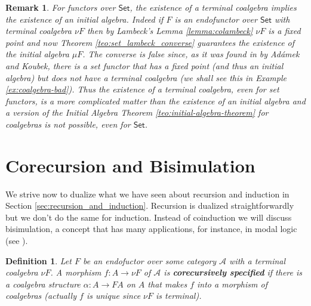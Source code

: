 \documentclass[letterpaper, 11pt, oneside]{memoir}
\theoremstyle{myteo}
\newtheorem{definition}[theorem]{Definition}
\newtheorem{remark}[theorem]{Remark}
\numberwithin{equation}{section}
\newcommand{\marginnote}[1]{\marginpar{\footnotesize #1}}
\newcommand{\Set}{\textsf{Set}}
\newcommand{\A}{\mathscr{A}}
\begin{document}
\begin{remark}
  \label{rem:tcoalgebra-implies-ialgebra}
  For functors over \(\Set\), the existence of a terminal coalgebra implies the existence of an initial algebra.
  Indeed if \(F\) is an endofunctor over \(\Set\) with terminal coalgebra \(\nu F\) then by Lambeck's Lemma \ref{lemma:colambeck} \(\nu F\) is a fixed point and now Theorem \ref{teo:set_lambeck_converse} guarantees the existence of the initial algebra \(\mu F\).
  The converse is false since, as it was found in \cite[Example 7]{Admek1995OnTG} by Adámek and Koubek, there is a set functor that has a fixed point (and thus an initial algebra) but does not have a terminal coalgebra (we shall see this in Example \ref{ex:coalgebra-bad}).
  Thus the existence of a terminal coalgebra, even for set functors, is a more complicated matter than the existence of an initial algebra and a version of the Initial Algebra Theorem \ref{teo:initial-algebra-theorem} for coalgebras is not possible, even for \(\Set\).
\end{remark}

\section{Corecursion and Bisimulation}

We strive now to dualize what we have seen about recursion and induction in Section \ref{sec:recursion_and_induction}.
Recursion is dualized straightforwardly but we don't do the same for induction.
Instead of coinduction we will discuss bisimulation, a concept that has many applications, for instance, in modal logic (see \cite[Section 3]{BLACKBURN20071}).

\begin{definition}
  Let \(F\) be an endofuctor over some category \(\A\) with a terminal coalgebra \(\nu F\).
  A morphism \(f: A \to \nu F\) of \(\A\) is \textbf{corecursively specified} \marginnote{corecursively specified morphism} if there is a coalgebra structure \(\alpha : A \to FA\) on \(A\) that makes \(f\) into a morphism of coalgebras (actually \(f\) is unique since \(\nu F\) is terminal).
\end{definition}
\end{document}
